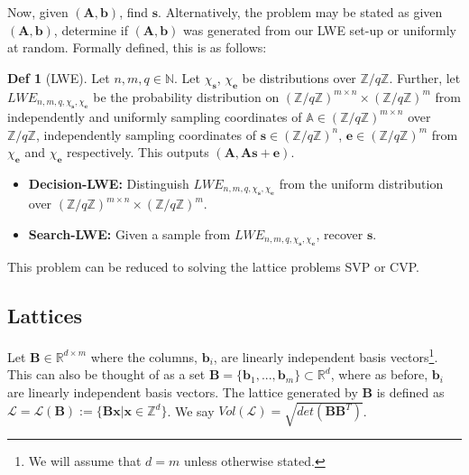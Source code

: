 \documentclass[a4paper, 10pt]{article}
\theoremstyle{definition}
\newtheorem{definition}{Def}[section]
\begin{document}
Now, given $(\mathbf{A},\mathbf{b})$, find $\mathbf{s}$. Alternatively, the problem may be stated as given $(\mathbf{A},\mathbf{b})$, determine if $(\mathbf{A},\mathbf{b})$ was generated from our \ac{LWE} set-up or uniformly at random. Formally defined, this is as follows:\par

\begin{definition}[\ac{LWE}]
    Let $n,m,q \in \mathbb{N}$. Let $\chi _\mathbf{s}$, $\chi _\mathbf{e}$ be distributions over $\mathbb{Z}/q\mathbb{Z}$. Further, let $LWE_{n,m,q,\chi _\mathbf{s}, \chi _\mathbf{e}}$ be the probability distribution on $(\mathbb{Z}/q\mathbb{Z})^{m \times n} \times (\mathbb{Z}/q\mathbb{Z})^m$ from independently and uniformly sampling coordinates of $\mathbb{A} \in(\mathbb{Z}/q\mathbb{Z})^{m \times n}$ over $\mathbb{Z}/q\mathbb{Z}$, independently sampling coordinates of $\mathbf{s}\in (\mathbb{Z}/q\mathbb{Z})^n$, $\mathbf{e}\in (\mathbb{Z}/q\mathbb{Z})^m$ from $\chi _\mathbf{e}$ and $\chi _\mathbf{e}$ respectively. This outputs $(\mathbf{A},\mathbf{As} + \mathbf{e})$.

    \begin{itemize}
        \item \textbf{Decision-LWE:} Distinguish $LWE_{n,m,q,\chi _\mathbf{s}, \chi _\mathbf{e}}$ from the uniform distribution over $(\mathbb{Z}/q\mathbb{Z})^{m \times n} \times (\mathbb{Z}/q\mathbb{Z})^m$.
        \item \textbf{Search-\ac{LWE}:} Given a sample from $LWE_{n,m,q,\chi _\mathbf{s}, \chi _\mathbf{e}}$, recover $\mathbf{s}$.
    \end{itemize}
\end{definition}

This problem can be reduced to solving the lattice problems \ac{SVP} or \ac{CVP}.\par  

\subsection{Lattices}

Let $\mathbf{B} \in \mathbb{R} ^{d\times m}$ where the columns, $\mathbf{b}_i$, are linearly independent basis vectors\footnote{We will assume that $d=m$ unless otherwise stated.}. This can also be thought of as a set $\mathbf{B}=\{\mathbf{b}_1,...,\mathbf{b}_m\}\subset \mathbb{R} ^d$, where as before, $\mathbf{b}_i$ are linearly independent basis vectors. The lattice generated by $\mathbf{B}$ is defined as $\mathcal{L} = \mathcal{L} (\mathbf{B}) := \{\mathbf{B} \mathbf{x} | \mathbf{x} \in \mathbb{Z} ^d\}$. We say $Vol(\mathcal{L}) = \sqrt{det(\mathbf{B} \mathbf{B}^T)}$.
\end{document}
